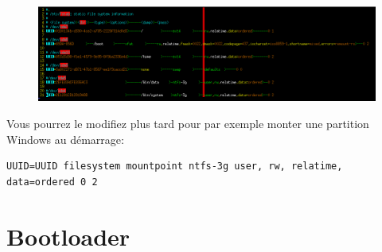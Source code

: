 \documentclass[a4paper]{book}
\begin{document}
\begin{figure}[h]
  \includegraphics[width=\textwidth]{images/fstab}
\end{figure}
Vous pourrez le modifiez plus tard pour par exemple monter une partition
Windows au démarrage\@:\\
\begin{lstlisting}
UUID=UUID filesystem mountpoint ntfs-3g user, rw, relatime, data=ordered 0 2
\end{lstlisting}

\chapter{Bootloader}
\end{document}
